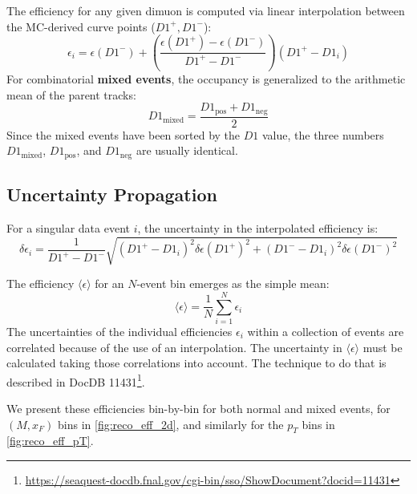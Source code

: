 \documentclass[11pt]{article}
\begin{document}
The efficiency for any given dimuon is computed via linear interpolation between the MC-derived curve points ($D1^+, D1^-$):
\begin{equation}
    \epsilon_i = \epsilon(D1^-) + \left(\frac{\epsilon(D1^+) - \epsilon(D1^-)}{D1^+ - D1^-} \right)\left(D1^+ - D1_i\right)
\end{equation}
For combinatorial \textbf{mixed events}, the occupancy is generalized to the arithmetic mean of the parent tracks:
\begin{equation}
    D1_{\text{mixed}} = \frac{D1_{\text{pos}} + D1_{\text{neg}}}{2}
\end{equation}
Since the mixed events have been sorted by the $D1$ value, the three numbers $D1_{\text{mixed}}$, $D1_{\text{pos}}$, and $D1_{\text{neg}}$ are usually identical.

\subsection{Uncertainty Propagation}
For a singular data event $i$, the uncertainty in the interpolated efficiency is:
\begin{equation}
\delta\epsilon_i = \frac{1}{D1^+-D1^-}\sqrt{\left(D1^+-D1_i\right)^2\delta\epsilon(D1^+)^2+\left(D1^--D1_i\right)^2\delta\epsilon(D1^-)^2}
\end{equation}

The efficiency $\langle\epsilon\rangle$ for an $N$-event bin emerges as the simple mean:
\begin{equation}
    \langle\epsilon\rangle = \frac{1}{N} \sum_{i=1}^{N} \epsilon_i \label{eq:avg_eff_2}
\end{equation}
The uncertainties of the individual efficiencies $\epsilon_i$ within a collection of events are correlated because of the use of an interpolation.  The uncertainty in $\langle\epsilon\rangle$ must be calculated taking those correlations into account.  The technique to do that is described in DocDB 11431\footnote{\url{https://seaquest-docdb.fnal.gov/cgi-bin/sso/ShowDocument?docid=11431}}.

We present these efficiencies bin-by-bin for both normal and mixed events, for $(M,x_F)$ bins in \cref{fig:reco_eff_2d},
and similarly for the $p_T$ bins in \cref{fig:reco_eff_pT}.
\end{document}
